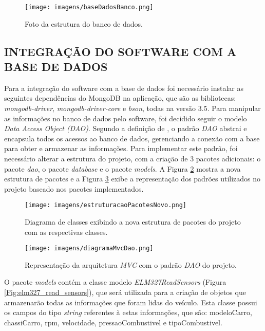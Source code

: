 \begin{figure}[!ht]
\centering
\caption{Foto da estrutura do banco de dados.} 
{\texttt{[image: imagens/baseDadosBanco.png]}}\\
 \label{Fig:base_dados}
\end{figure}

\subsection{INTEGRAÇÃO DO SOFTWARE COM A BASE DE DADOS}
Para a integração do software com a base de dados foi necessário instalar as seguintes dependências do MongoDB na aplicação, que são as bibliotecas: \textit{mongodb-driver}, \textit{mongodb-driver-core} e \textit{bson}, todas na versão 3.5. Para manipular as informações no banco de dados pelo software, foi decidido seguir o modelo \textit{Data Access Object (DAO)}. Segundo a definição de , o padrão \textit{DAO} abstrai e encapsula todos os acessos ao banco de dados, gerenciando a conexão com a base para obter e armazenar as informações. Para implementar este padrão, foi necessário alterar a estrutura do projeto, com a criação de 3 pacotes adicionais: o pacote \textit{dao}, o pacote \textit{database} e o pacote \textit{models}. A Figura \ref{Fig:diagrama_classe_novo} mostra a nova estrutura de pacotes e a Figura \ref{Fig:diagrama_mvc_dao} exibe a representação dos padrões utilizados no projeto baseado nos pacotes implementados.

\begin{figure}[!ht]
\centering
\caption{Diagrama de classes exibindo a nova estrutura de pacotes do projeto com as respectivas classes.} 
{\texttt{[image: imagens/estruturacaoPacotesNovo.png]}}\\
 \label{Fig:diagrama_classe_novo}
\end{figure}

\begin{figure}[!ht]
\centering
\caption{Representação da arquitetura \textit{MVC} com o padrão \textit{DAO} do projeto.} 
{\texttt{[image: imagens/diagramaMvcDao.png]}}\\
 \label{Fig:diagrama_mvc_dao}
\end{figure}

O pacote \textit{models} contém a classe modelo \textit{ELM327ReadSensors} (Figura \ref{Fig:elm327_read_sensors}), que será utilizada para a criação de objetos que armazenarão todas as informações que foram lidas do veículo. Esta classe possui os campos do tipo \textit{string} referentes à estas informações, que são: modeloCarro, chassiCarro, rpm, velocidade, pressaoCombustivel e tipoCombustivel.

